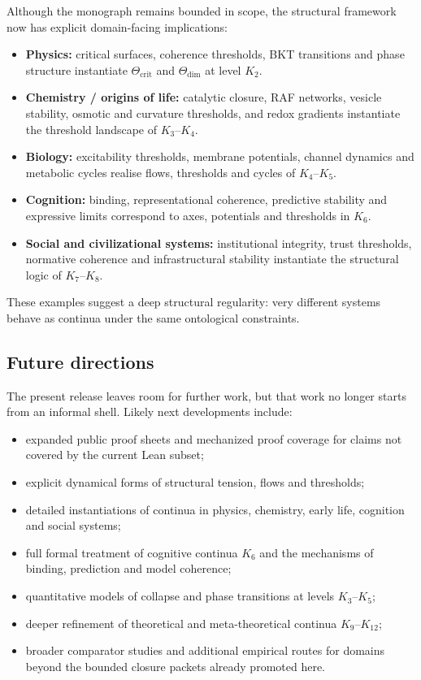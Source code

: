 Although the monograph remains bounded in scope, the structural framework now
has explicit domain-facing implications:

\begin{itemize}
    \item \textbf{Physics:} critical surfaces, coherence thresholds, BKT transitions and phase structure instantiate 
          \(\Theta_{\mathrm{crit}}\) and \(\Theta_{\mathrm{dim}}\) at level \(K_2\).
    \item \textbf{Chemistry / origins of life:} catalytic closure, RAF networks, vesicle stability, 
          osmotic and curvature thresholds, and redox gradients instantiate the threshold landscape of \(K_3\)–\(K_4\).
    \item \textbf{Biology:} excitability thresholds, membrane potentials, channel dynamics and 
          metabolic cycles realise flows, thresholds and cycles of \(K_4\)–\(K_5\).
    \item \textbf{Cognition:} binding, representational coherence, predictive stability and expressive limits 
          correspond to axes, potentials and thresholds in \(K_6\).
    \item \textbf{Social and civilizational systems:} institutional integrity, trust thresholds, 
          normative coherence and infrastructural stability instantiate the structural logic of \(K_7\)–\(K_8\).
\end{itemize}

These examples suggest a deep structural regularity:  
very different systems behave as continua under the same ontological constraints.

\subsection{Future directions}

The present release leaves room for further work, but that work no longer
starts from an informal shell. Likely next developments include:

\begin{itemize}
    \item expanded public proof sheets and mechanized proof coverage for claims not covered by the current Lean subset;
    \item explicit dynamical forms of structural tension, flows and thresholds;
    \item detailed instantiations of continua in physics, chemistry, early life, cognition and social systems;
    \item full formal treatment of cognitive continua \(K_6\) and the mechanisms of binding, prediction and model coherence;
    \item quantitative models of collapse and phase transitions at levels \(K_3\)–\(K_5\);
    \item deeper refinement of theoretical and meta-theoretical continua \(K_9\)–\(K_{12}\);
    \item broader comparator studies and additional empirical routes for domains beyond the bounded closure packets already promoted here.
\end{itemize}

